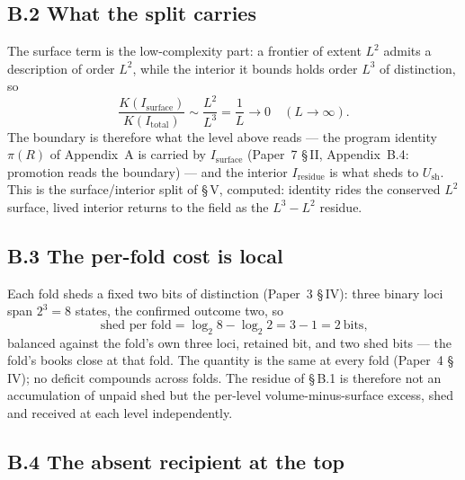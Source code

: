 \documentclass[11pt,oneside]{report}
\theoremstyle{definition}
\theoremstyle{remark}
\begin{document}
\subsection*{B.2 What the split carries}

The surface term is the low-complexity part: a frontier of extent \ensuremath{L^2} admits a
description of order \ensuremath{L^2}, while the interior it bounds holds order \ensuremath{L^3} of
distinction, so
\[
  \frac{K(I_{\mathrm{surface}})}{K(I_{\mathrm{total}})} \sim \frac{L^2}{L^3} = \frac{1}{L} \to 0
  \quad (L \to \infty).
\]
The boundary is therefore what the level above reads --- the program identity \ensuremath{\pi(R)} of
Appendix~A is carried by \ensuremath{I_{\mathrm{surface}}} (Paper~7 \S\,II, Appendix~B.4: promotion
reads the boundary) --- and the interior \ensuremath{I_{\mathrm{residue}}} is what sheds to
\ensuremath{U_{\mathrm{sh}}}. This is the surface/interior split of \S\,V, computed: identity rides
the conserved \ensuremath{L^2} surface, lived interior returns to the field as the
\ensuremath{L^3 - L^2} residue.

\subsection*{B.3 The per-fold cost is local}

Each fold sheds a fixed two bits of distinction (Paper~3 \S\,IV): three binary loci span
\ensuremath{2^3 = 8} states, the confirmed outcome two, so
\[
  \text{shed per fold} = \log_2 8 - \log_2 2 = 3 - 1 = 2 \ \text{bits,}
\]
balanced against the fold's own three loci, retained bit, and two shed bits --- the fold's books
close at that fold. The quantity is the same at every fold (Paper~4 \S\,IV); no deficit compounds
across folds. The residue of \S\,B.1 is therefore not an accumulation of unpaid shed but the
per-level volume-minus-surface excess, shed and received at each level independently.

\subsection*{B.4 The absent recipient at the top}
\end{document}

